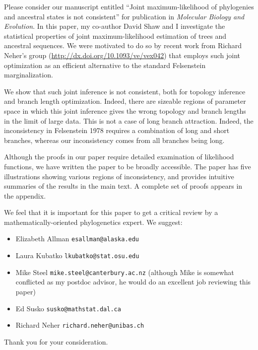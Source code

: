 \documentclass[letterpaper,10pt]{article}
\begin{document}
Please consider our manuscript entitled ``Joint maximum-likelihood of phylogenies and ancestral states is not consistent'' for publication in \textit{Molecular Biology and Evolution}.
In this paper, my co-author David Shaw and I investigate the statistical properties of joint maximum-likelihood estimation of trees and ancestral sequences.
We were motivated to do so by recent work from Richard Neher's group (\url{http://dx.doi.org/10.1093/ve/vex042}) that employs such joint optimization as an efficient alternative to the standard Felsenstein marginalization.

We show that such joint inference is not consistent, both for topology inference and branch length optimization.
Indeed, there are sizeable regions of parameter space in which this joint inference gives the wrong topology and branch lengths in the limit of large data.
This is not a case of long branch attraction.
Indeed, the inconsistency in Felsenstein 1978 requires a combination of long and short branches, whereas our inconsistency comes from all branches being long.

Although the proofs in our paper require detailed examination of likelihood functions, we have written the paper to be broadly accessible.
The paper has five illustrations showing various regions of inconsistency, and provides intuitive summaries of the results in the main text.
A complete set of proofs appears in the appendix.

We feel that it is important for this paper to get a critical review by a mathematically-oriented phylogenetics expert.
We suggest:
\begin{itemize}
\item Elizabeth Allman \texttt{esallman@alaska.edu}
\item Laura Kubatko \texttt{lkubatko@stat.osu.edu}
\item Mike Steel \texttt{mike.steel@canterbury.ac.nz} (although Mike is somewhat conflicted as my postdoc advisor, he would do an excellent job reviewing this paper)
\item Ed Susko \texttt{susko@mathstat.dal.ca}
\item Richard Neher \texttt{richard.neher@unibas.ch}
\end{itemize}

Thank you for your consideration.
\end{document}
